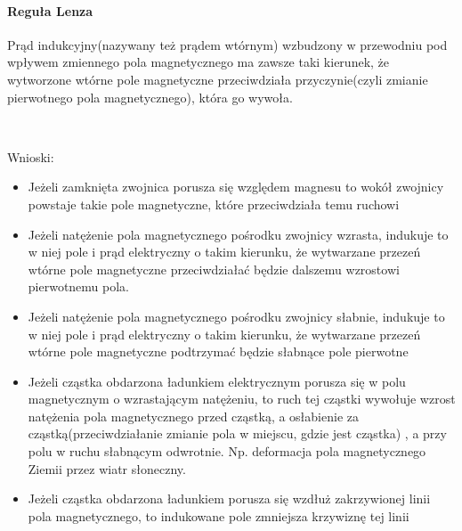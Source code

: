 \documentclass{article}
\begin{document}
            \paragraph{Reguła Lenza}
            Prąd indukcyjny(nazywany też prądem wtórnym) wzbudzony w przewodniu pod wpływem
            zmiennego pola magnetycznego ma zawsze taki kierunek, że wytworzone wtórne
            pole magnetyczne przeciwdziała przyczynie(czyli zmianie pierwotnego pola magnetycznego),
            która go wywoła.

            \
            
            Wnioski:
            \begin{itemize}
                \item Jeżeli zamknięta zwojnica porusza się względem magnesu to wokół zwojnicy
                powstaje takie pole magnetyczne, które przeciwdziała temu ruchowi
                \item Jeżeli natężenie pola magnetycznego pośrodku zwojnicy wzrasta, indukuje
                to w niej pole i prąd elektryczny o takim kierunku, że wytwarzane przezeń wtórne
                pole magnetyczne przeciwdziałać będzie dalszemu wzrostowi pierwotnemu pola.
                \item Jeżeli natężenie pola magnetycznego pośrodku zwojnicy słabnie, indukuje to w
                niej pole i prąd elektryczny o takim kierunku, że wytwarzane przezeń wtórne
                pole magnetyczne podtrzymać będzie słabnące pole pierwotne
                \item Jeżeli cząstka obdarzona ładunkiem elektrycznym porusza się w polu magnetycznym
                o wzrastającym natężeniu, to ruch tej cząstki wywołuje wzrost natężenia pola magnetycznego
                przed cząstką, a osłabienie za cząstką(przeciwdziałanie zmianie pola w miejscu, gdzie jest cząstka)
                , a przy polu w ruchu słabnącym odwrotnie. Np. deformacja pola magnetycznego
                Ziemii przez wiatr słoneczny.
                \item Jeżeli cząstka obdarzona ładunkiem porusza się wzdłuż zakrzywionej linii pola
                magnetycznego, to indukowane pole zmniejsza krzywiznę tej linii 
            \end{itemize}
\end{document}
